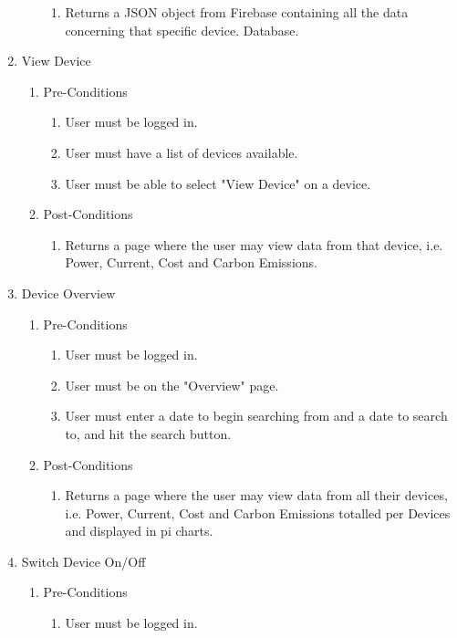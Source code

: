 \documentclass{article}
\begin{document}
\begin{enumerate}
\begin{enumerate}
\begin{enumerate}
				\item	Returns a JSON object from Firebase containing all the data concerning that specific device. Database.
			\end{enumerate}
		\end{enumerate}
		\item	View Device
		\begin{enumerate}
			\item  Pre-Conditions
			\begin{enumerate}
				\item	User must be logged in.
				\item	User must have a list of devices available.
				\item	User must be able to select "View Device" on a device.
			\end{enumerate}
			\item  Post-Conditions		
			\begin{enumerate}
				\item	Returns a page where the user may view data from that device, i.e. Power, Current, Cost and Carbon Emissions.
			\end{enumerate}
		\end{enumerate}
		\item	Device Overview
		\begin{enumerate}
			\item  Pre-Conditions
			\begin{enumerate}
				\item	User must be logged in.
				\item	User must be on the "Overview" page.
				\item	User must enter a date to begin searching from and a date to search to, and hit the search button.
			\end{enumerate}
			\item  Post-Conditions		
			\begin{enumerate}
				\item	Returns a page where the user may view data from all their devices, i.e. Power, Current, Cost and Carbon Emissions totalled per Devices and displayed in pi charts.
			\end{enumerate}
		\end{enumerate}
		\item	Switch Device On/Off
		\begin{enumerate}
				\item  Pre-Conditions
				\begin{enumerate}
					\item	User must be logged in.

\end{enumerate}
\end{enumerate}
\end{enumerate}
\end{document}
